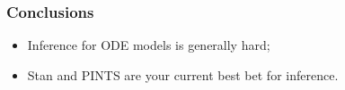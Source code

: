 \documentclass[handout]{beamer}
\begin{document}
\begin{frame}
\frametitle{Conclusions}

\begin{itemize}
	\item Inference for ODE models is generally hard;
	\item Stan and PINTS are your current best bet for inference.
\end{itemize}

\end{frame}



	 
\end{document}

